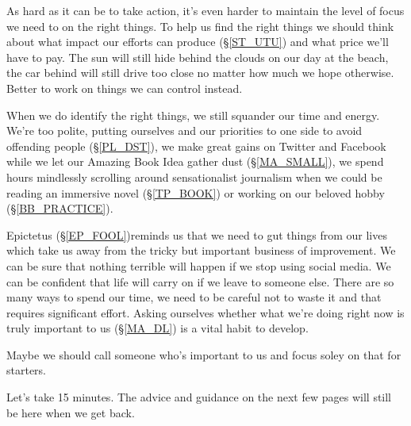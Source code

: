 \cleardoublepage
{\small

As hard as it can be to take action, it's even harder to maintain the level of focus we need to on the right things. To help us find the right things we should think about what impact our efforts can produce (\S \ref{ST_UTU}) and what price we'll have to pay. The sun will still hide behind the clouds on our day at the beach, the car behind will still drive too close no matter how much we hope otherwise. Better to work on things we can control instead.  %

When we do identify the right things, we still squander our time and energy. We're too polite, putting ourselves and our priorities to one side to avoid offending people (\S \ref{PL_DST}), we make great gains on Twitter and Facebook while we let our Amazing Book Idea gather dust (\S \ref{MA_SMALL}), we spend hours mindlessly scrolling around sensationalist journalism when we could be reading an immersive novel (\S \ref{TP_BOOK}) or working on our beloved hobby (\S \ref{BB_PRACTICE}). 

Epictetus (\S \ref{EP_FOOL})reminds us that we need to gut things from our lives which take us away from the tricky but important business of improvement. We can be sure that nothing terrible will happen if we stop using social media. We can be confident that life will carry on if we leave  to someone else. There are so many ways to spend our time, we need to be careful not to waste it and that requires significant effort. Asking ourselves whether what we're doing right now is truly important to us (\S \ref{MA_DL}) is a vital habit to develop.

Maybe we should call someone who's important to us and focus soley on that for starters. 

Let's take 15 minutes. The advice and guidance on the next few pages will still be here when we get back. 

}
